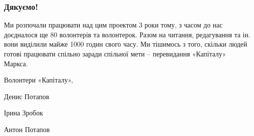 \documentclass{kapital}
\begin{document}
{  \subsubsection*{Дякуємо!}

  Ми розпочали працювати над цим проектом 3 роки тому, з часом до нас доєдналося ще 80 волонтерів та волонтерок. Разом на читання, редагування та ін. вони виділили майже 1000 годин свого часу. Ми тішимось з того, скільки людей готові працювати спільно заради спільної мети – перевидання «Капіталу» Маркса. 

  \bigskip{}

  \noindent{}Волонтери «Капіталу»,

  \medskip{}

  \noindent{}Денис Потапов

  \noindent{}Ірина Зробок

  \noindent{}Антон Потапов
}
\end{document}
